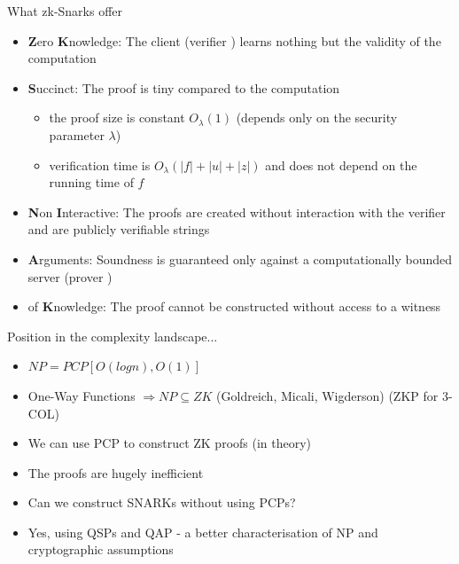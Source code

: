 \documentclass[handout]{beamer}
\begin{document}
\begin{frame}{What zk-Snarks offer}
\begin{itemize}
    \item \textbf{Z}ero \textbf{K}nowledge: The client (verifier \ver) learns nothing but the validity of the computation \pause
    \item \textbf{S}uccinct: The proof is tiny compared to the computation \pause
    \begin{itemize}
        \item the proof size is constant $O_{\lambda}(1)$ (depends only on the security parameter $\lambda$)
        \item verification time is $O_{\lambda}(|f| + |u| + |z|)$ and does not depend on the running time of $f$
    \end{itemize} \pause
    \item \textbf{N}on \textbf{I}nteractive: The proofs are created without interaction with the verifier and are publicly verifiable strings \pause
    \item \textbf{A}rguments: Soundness is guaranteed only against a computationally bounded server (prover \prv) \pause
    \item of \textbf{K}nowledge: The proof cannot be constructed without access to a witness
\end{itemize}
\end{frame}

\begin{frame}{Position in the complexity landscape...}
    \begin{itemize}
        \item $NP = PCP[O(logn),O(1)]$ \pause
        \item One-Way Functions $ \Rightarrow NP \subseteq ZK$ (Goldreich, Micali, Wigderson) (ZKP for 3-COL) \pause
        \item We can use PCP to construct ZK proofs (in theory) \pause
        \item The proofs are hugely inefficient \pause
        \item Can we construct SNARKs without using PCPs? \pause
        \item Yes, using QSPs and QAP - a better characterisation of NP and cryptographic assumptions
    \end{itemize}
\end{frame}
\end{document}
